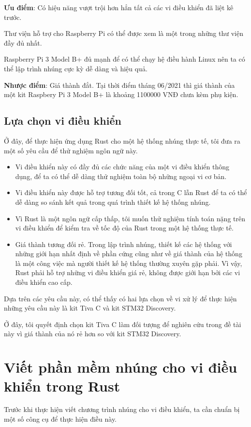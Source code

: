 \pagebreak
\textbf{Ưu điểm}: Có hiệu năng vượt trội hơn hẳn tất cả các vi điều khiển đã liệt kê trước.

Thư viện hỗ trợ cho Raspberry Pi có thể được xem là một trong những thư viện đầy đủ nhất.

Raspberry Pi 3 Model B+ đủ mạnh để có thể chạy hệ điều hành Linux nên ta có thể lập trình nhúng cực kỳ dễ dàng và hiệu quả.

\textbf{Nhược điểm}: Giá thành đắt. Tại thời điểm tháng 06/2021 thì giá thành của một kit Raspbery Pi 3 Model B+ là khoảng 1100000 VNĐ chưa kèm phụ kiện.

\subsection{Lựa chọn vi điều khiển}

Ở đây, để thực hiện ứng dụng Rust cho một hệ thống nhúng thực tế, tôi đưa ra một số yêu cầu để thử nghiệm ngôn ngữ này.

\begin{itemize}
    \item Vi điều khiển này có đầy đủ các chức năng của một vi điều khiển thông dụng, để ta có thể dễ dàng thử nghiệm toàn bộ những ngoại vi cơ bản.
    \item Vi điều khiển này được hỗ trợ tương đối tốt, cả trong C lẫn Rust để ta có thể dễ dàng so sánh kết quả trong quá trình thiết kế hệ thống nhúng.
    \item Vì Rust là một ngôn ngữ cấp thấp, tôi muốn thử nghiệm tính toán nặng trên vi điều khiển để kiểm tra về tốc độ của Rust trong một hệ thống thực tế.
    \item Giá thành tương đối rẻ.
        Trong lập trình nhúng, thiết kế các hệ thống với những giới hạn nhất định về phần cứng cũng như về giá thành của hệ thống là một công việc mà người thiết kế hệ thống thường xuyên gặp phải.
        Vì vậy, Rust phải hỗ trợ những vi điều khiển giá rẻ, không được giới hạn bởi các vi điều khiển cao cấp.
\end{itemize}

Dựa trên các yêu cầu này, có thể thấy có hai lựa chọn về vi xử lý để thực hiện những yêu cầu này là kit Tiva C và kit STM32 Discovery.

Ở đây, tôi quyết định chọn kit Tiva C làm đối tượng để nghiên cứu trong đề tài này vì giá thành của nó rẻ hơn so với kit STM32 Discovery.

\section{Viết phần mềm nhúng cho vi điều khiển trong Rust}
Trước khi thực hiện viết chương trình nhúng cho vi điều khiển, ta cần chuẩn bị một số công cụ để thực hiện điều này.

